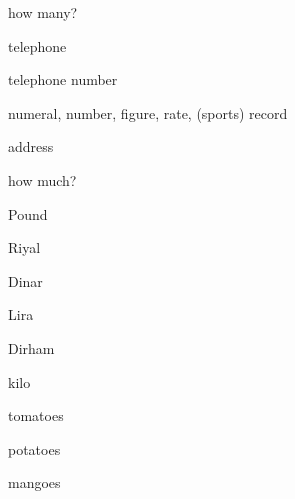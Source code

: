 \begin{flashcard}{\LARGE how many?}
\LARGE {}
\end{flashcard}
\begin{flashcard}{\LARGE telephone}
\LARGE {}
\end{flashcard}
\begin{flashcard}{\LARGE telephone number}
\LARGE {}
\end{flashcard}
\begin{flashcard}{\LARGE numeral, number, figure, rate, (sports) record}
\LARGE {}
\end{flashcard}
\begin{flashcard}{\LARGE address}
\LARGE {}
\end{flashcard}
\begin{flashcard}{\LARGE how much?}
\LARGE {}
\end{flashcard}
\begin{flashcard}{\LARGE Pound}
\LARGE {}
\end{flashcard}
\begin{flashcard}{\LARGE Riyal}
\LARGE {}
\end{flashcard}
\begin{flashcard}{\LARGE Dinar}
\LARGE {}
\end{flashcard}
\begin{flashcard}{\LARGE Lira}
\LARGE {}
\end{flashcard}
\begin{flashcard}{\LARGE Dirham}
\LARGE {}
\end{flashcard}
\begin{flashcard}{\LARGE kilo}
\LARGE {}
\end{flashcard}
\begin{flashcard}{\LARGE tomatoes}
\LARGE {}
\end{flashcard}
\begin{flashcard}{\LARGE potatoes}
\LARGE {}
\end{flashcard}
\begin{flashcard}{\LARGE mangoes}
\LARGE {}
\end{flashcard}
